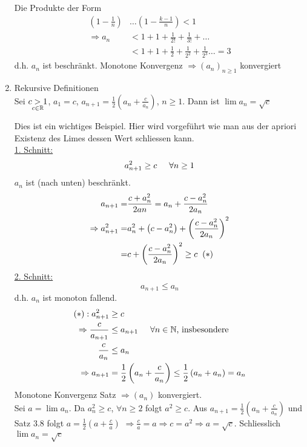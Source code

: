 \begin{enumerate}
\begin{beweis}{}
\noindent Die Produkte der Form
\begin{align*}
\left( {1 - \frac{1}{n}} \right) &\ldots \left( {1 - \frac{{k - 1}}{n}} \right) < 1\\
 \Rightarrow {a_n} &< 1 + 1 + \frac{1}{{2!}} + \frac{1}{{3!}} +  \ldots \\
&< 1 + 1 + \frac{1}{2} + \frac{1}{{{2^2}}} + \frac{1}{{{2^3}}} \ldots  = 3
\end{align*}
d.h. $a_n$ ist beschränkt. Monotone Konvergenz $\Rightarrow \left( a_n\right)_{n\geq 1}$ konvergiert
\end{beweis}
\item Rekursive Definitionen\\
Sei $\mathop {c > 1}\limits_{c \in\mathbb{R} }$, $a_1=c$, ${a_{n + 1}} = \frac{1}{2}\left( {{a_n} + \frac{c}{{{a_n}}}} \right)$, $n\geq 1$. Dann ist $\lim a_n=\sqrt{c}$
\begin{beweis}{}
Dies ist ein wichtiges Beispiel. Hier wird vorgeführt wie man aus der apriori Existenz des Limes dessen Wert schliessen kann.\\

\noindent\underline{1. Schnitt:}
\[a_{n + 1}^2 \ge c\hspace{5mm}\forall n\geq 1\]
$a_n$ ist (nach unten) beschränkt. 
\begin{align*}
{a_{n + 1}} =&\frac{{c + a_n^2}}{{2an}} = {a_n} + \frac{{c - a_n^2}}{{2{a_n}}}\\
 \Rightarrow a_{n + 1}^2 =&a_n^2 + \left( {c - a_n^2} \right) + {\left( {\frac{{c - a_n^2}}{{2{a_n}}}} \right)^2}\\
 =&c + {\left( {\frac{{c - a_n^2}}{{2{a_n}}}} \right)^2} \ge c\hspace{2mm}\text{(\textasteriskcentered)}
\end{align*}
\noindent\underline{2. Schnitt:}
\[a_{n+1}\leq a_n\]
d.h. $a_n$ ist monoton fallend. 
\begin{align*}
\text{(\textasteriskcentered)}: a_{n+1}^2&\geq c\\
\Rightarrow\frac{c}{a_{n+1}}&\leq a_{n+1}\hspace{5mm} \forall n\in\N\text{, insbesondere}\\
\frac{c}{a_n}&\leq a_n \\
\Rightarrow a_{n+1}&=\frac{1}{2}\left( {{a_n} + \frac{c}{{{a_n}}}} \right) \le \frac{1}{2}\left( {{a_n} + {a_n}} \right) = {a_n}
\end{align*}
Monotone Konvergenz Satz $\Rightarrow\left( a_n\right)$ konvergiert.\\

\noindent Sei $a=\lim a_n$. Da $a_n^2\geq c$, $\forall n\geq 2$ folgt $a^2\geq c$. Aus $a_{n+1}=\frac{1}{2}\left( a_n+\frac{c}{a_n}\right)$ und Satz 3.8 folgt $a=\frac{1}{2}\left( a+\frac{c}{a}\right)$ $\Rightarrow\frac{c}{a}=a\Rightarrow c=a^2\Rightarrow a=\sqrt{c}$. Schliesslich $\lim a_n=\sqrt{c}$
\end{beweis}
\end{enumerate}

